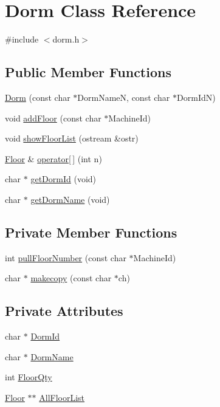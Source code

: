 \hypertarget{classDorm}{}\section{Dorm Class Reference}
\label{classDorm}


{\ttfamily \#include $<$dorm.\+h$>$}

\subsection*{Public Member Functions}
\begin{DoxyCompactItemize}
\item 
\hyperlink{classDorm_ade9d5f0af745d63ed64aca2c4c43c075}{Dorm} (const char $\ast$Dorm\+Name\+N, const char $\ast$Dorm\+Id\+N)
\item 
void \hyperlink{classDorm_a6a29bc53aa4e1d3dd5ba9ae992825fea}{add\+Floor} (const char $\ast$Machine\+Id)
\item 
void \hyperlink{classDorm_ac7f1c2c4f2df20ae95edb1c94acc8292}{show\+Floor\+List} (ostream \&ostr)
\item 
\hyperlink{classFloor}{Floor} \& \hyperlink{classDorm_a3273d514b7676789d69f76ca3eddd1f5}{operator\mbox{[}$\,$\mbox{]}} (int n)
\item 
char $\ast$ \hyperlink{classDorm_a129fd869bbd0a5f3288a9f915c432430}{get\+Dorm\+Id} (void)
\item 
char $\ast$ \hyperlink{classDorm_a901bdbaa576fb0fc4426d5b6e8779109}{get\+Dorm\+Name} (void)
\end{DoxyCompactItemize}
\subsection*{Private Member Functions}
\begin{DoxyCompactItemize}
\item 
int \hyperlink{classDorm_a020a53d32768e94e0025b11cf143794c}{pull\+Floor\+Number} (const char $\ast$Machine\+Id)
\item 
char $\ast$ \hyperlink{classDorm_a1930daf57fe048209767188141a5c316}{makecopy} (const char $\ast$ch)
\end{DoxyCompactItemize}
\subsection*{Private Attributes}
\begin{DoxyCompactItemize}
\item 
char $\ast$ \hyperlink{classDorm_a87128b7e2f33c987306fbdfd750b30e7}{Dorm\+Id}
\item 
char $\ast$ \hyperlink{classDorm_aa0155c1025ef94bf9d8356285d43d9d5}{Dorm\+Name}
\item 
int \hyperlink{classDorm_a1f347c933203cb469536f9b49e99fe1b}{Floor\+Qty}
\item 
\hyperlink{classFloor}{Floor} $\ast$$\ast$ \hyperlink{classDorm_a223c00d027dae0931caf1cda7b042925}{All\+Floor\+List}
\end{DoxyCompactItemize}


